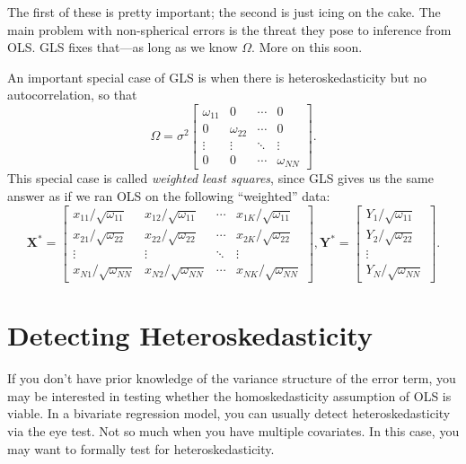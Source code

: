 \documentclass[
  12pt,
  oneside,openany]{book}
\begin{document}
The first of these is pretty important; the second is just icing on the cake. The main problem with non-spherical errors is the threat they pose to inference from OLS. GLS fixes that---as long as we know \(\Omega\). More on this soon.

An important special case of GLS is when there is heteroskedasticity but no autocorrelation, so that
\[
\Omega = \sigma^2 \begin{bmatrix}
  \omega_{11} & 0 & \cdots & 0 \\
  0 & \omega_{22} & \cdots & 0 \\
  \vdots & \vdots & \ddots & \vdots \\
  0 & 0 & \cdots & \omega_{NN}
\end{bmatrix}.
\]
This special case is called \emph{weighted least squares}, since GLS gives us the same answer as if we ran OLS on the following ``weighted'' data:
\[
\mathbf{X}^* = \begin{bmatrix}
  x_{11} / \sqrt{\omega_{11}} & x_{12} / \sqrt{\omega_{11}} & \cdots & x_{1K} / \sqrt{\omega_{11}} \\
  x_{21} / \sqrt{\omega_{22}} & x_{22} / \sqrt{\omega_{22}} & \cdots & x_{2K} / \sqrt{\omega_{22}} \\
  \vdots & \vdots & \ddots & \vdots \\
  x_{N1} / \sqrt{\omega_{NN}} & x_{N2} / \sqrt{\omega_{NN}} & \cdots & x_{NK} / \sqrt{\omega_{NN}}
\end{bmatrix},
\mathbf{Y}^* = \begin{bmatrix}
  Y_1 / \sqrt{\omega_{11}} \\
  Y_2 / \sqrt{\omega_{22}} \\
  \vdots \\
  Y_N / \sqrt{\omega_{NN}}
\end{bmatrix}.
\]

\hypertarget{detecting-heteroskedasticity}{%
\section{Detecting Heteroskedasticity}\label{detecting-heteroskedasticity}}

If you don't have prior knowledge of the variance structure of the error term, you may be interested in testing whether the homoskedasticity assumption of OLS is viable. In a bivariate regression model, you can usually detect heteroskedasticity via the eye test. Not so much when you have multiple covariates. In this case, you may want to formally test for heteroskedasticity.
\end{document}
